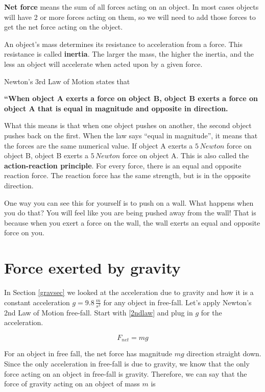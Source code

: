 \documentclass[12pt]{book}
\begin{document}
\textbf{Net force} means the sum of all forces acting on an object. In most cases objects will have 2 or more forces acting on them, so we will need to add those forces to get the net force acting on the object.

An object's mass determines its resistance to acceleration from a force. This resistance is called \textbf{inertia}. The larger the mass, the higher the inertia, and the less an object will accelerate when acted upon by a given force.

\linespace

Newton's 3rd Law of Motion states that

\hspace{10pt}

\textbf{``When object A exerts a force on object B, object B exerts a force on object A that is equal in magnitude and opposite in direction.}

\linespace

What this means is that when one object pushes on another, the second object pushes back on the first. When the law says ``equal in magnitude'', it means that the forces are the same numerical value. If object A exerts a $5 \, Newton$ force on object B, object B exerts a $5 \, Newton$ force on object A. This is also called the \textbf{action-reaction principle}. For every force, there is an equal and opposite reaction force. The reaction force has the same strength, but is in the opposite direction.

One way you can see this for yourself is to push on a wall. What happens when you do that? You will feel like you are being pushed away from the wall! That is because when you exert a force on the wall, the wall exerts an equal and opposite force on you. 



\section{Force exerted by gravity}

In Section \ref{gravsec} we looked at the acceleration due to gravity and how it is a constant acceleration $g = 9.8 \, \frac{m}{s^2}$ for any object in free-fall. Let's apply Newton's 2nd Law of Motion free-fall. Start with \ref{2ndlaw} and plug in $g$ for the acceleration.

\begin{equation}
F_{net} = mg
\end{equation}

For an object in free fall, the net force has magnitude $mg$ direction straight down. Since the only acceleration in free-fall is due to gravity, we know that the only force acting on an object in free-fall is gravity. Therefore, we can say that the force of gravity acting on an object of mass $m$ is
\end{document}
